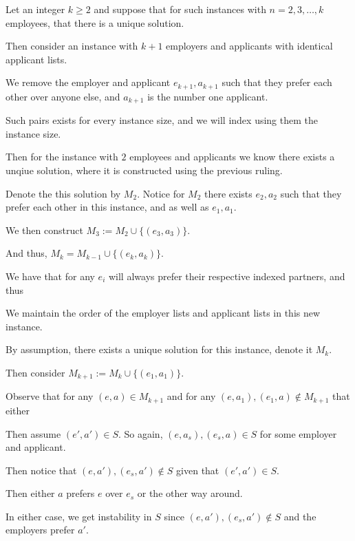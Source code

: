 \begin{questions}
\begin{soln}
		Let an integer \(k \geq 2\) and suppose that for such instances with \(n = 2, 3, \dots, k\) employees, that there is a unique solution.

		Then consider an instance with \(k + 1\) employers and applicants with identical applicant lists.

		We remove the employer and applicant \(e_{k+1}, a_{k+1}\) such that they prefer each other over anyone else, and \(a_{k+1}\) is the number one applicant.

		Such pairs exists for every instance size, and we will index using them the instance size.

		Then for the instance with \(2\) employees and applicants we know there exists a unqiue solution, where it is constructed using the previous ruling.

		Denote the this solution by \(M_2\). Notice for \(M_2\) there exists \(e_2, a_2\) such that they prefer each other in this instance, and as well as \(e_1, a_1\).

		We then construct \(M_3 := M_2 \cup \{(e_3, a_3)\}\).

		And thus, \(M_{k} = M_{k - 1} \cup \{(e_k, a_k)\}\).

		We have that for any \(e_i\) will always prefer their respective indexed partners, and thus


		We maintain the order of the employer lists and applicant lists in this new instance.

		By assumption, there exists a unique solution for this instance, denote it \(M_k\).

		Then consider \(M_{k+1} := M_k \cup \{(e_1, a_1)\}\).

		Observe that for any \((e, a) \in M_{k+1}\) and for any \((e, a_1), (e_1, a) \notin M_{k+1}\) that either


	\end{soln}
	Then assume \((e', a') \in S\). So again, \((e, a_s), (e_s, a) \in S\) for some employer and applicant.

	Then notice that \((e, a'), (e_s, a') \notin S\) given that \((e', a') \in S\).

	Then either \(a\) prefers \(e\) over \(e_s\) or the other way around.

	In either case, we get instability in \(S\) since \((e, a'), (e_s, a') \notin S\) and the employers prefer \(a'\).

\end{questions}
